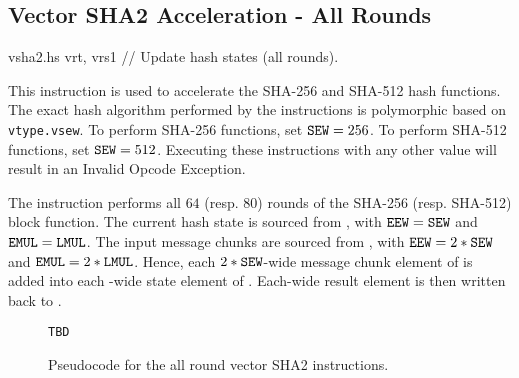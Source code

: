 \subsection{Vector SHA2 Acceleration - All Rounds}
\label{sec:vector:sha2:all-round}

\begin{cryptoisa}
vsha2.hs vrt, vrs1      // Update hash states (all rounds).
\end{cryptoisa}

This instruction is used to accelerate the SHA-256 and SHA-512
hash functions.
The exact hash algorithm performed by the instructions is
polymorphic based on {\tt vtype.vsew}.
To perform SHA-256 functions, set ${\tt SEW}=256$.
To perform SHA-512 functions, set ${\tt SEW}=512$.
Executing these instructions with any other \SEW value will
result in an Invalid Opcode Exception.

The  instruction performs all
$64$ (resp. $80$) rounds of the SHA-256 (resp. SHA-512) block function.
The current hash state is sourced from \vrt,
with ${\tt EEW}={\tt SEW}$ and ${\tt EMUL}={\tt LMUL}$.
The input message chunks are sourced from ,
with ${\tt EEW}=2*{\tt SEW}$ and ${\tt EMUL}=2*{\tt LMUL}$.
Hence, each $2*{\tt SEW}$-wide message chunk element of  is added into each
\SEW-wide state element of \vrt.
Each\SEW-wide result element is then written back to \vrt.

\begin{figure}[h]
\begin{lstlisting}[language=pseudo]
TBD
\end{lstlisting}
\caption{Pseudocode for the all round vector SHA2 instructions.}
\label{fig:pseudo:sha:all-round}
\end{figure}
